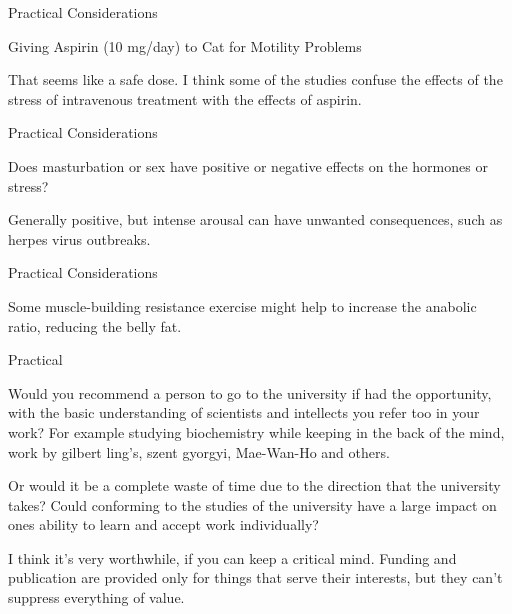 \documentclass[11pt,oneside,openany,extrafontsizes]{memoir}
\begin{document}
\begin{standalonequote}{Practical Considerations}
    \begin{note}
        Giving Aspirin (10 mg/day) to Cat for Motility Problems
    \end{note}

    \begin{answer}
        That seems like a safe dose. I think some of the studies confuse the effects of the stress of intravenous treatment with the effects of aspirin.
    \end{answer}
\end{standalonequote}

\begin{qaexchange}{Practical Considerations}

    \begin{question}
        Does masturbation or sex have positive or negative effects on the hormones or stress?
    \end{question}

    \begin{answer}
        Generally positive, but intense arousal can have unwanted consequences, such as herpes virus outbreaks.
    \end{answer}
\end{qaexchange}

\begin{standalonequote}{Practical Considerations}

    \begin{answer}
        Some muscle-building resistance exercise might help to increase the anabolic ratio, reducing the belly fat.
    \end{answer}
\end{standalonequote}

\begin{qaexchange}{Practical}

    \begin{question}
        Would you recommend a person to go to the university if had the opportunity, with the basic understanding of scientists and intellects you refer too in your work? For example studying biochemistry while keeping in the back of the mind, work by gilbert ling's, szent gyorgyi, Mae-Wan-Ho and others.

        Or would it be a complete waste of time due to the direction that the university takes? Could conforming to the studies of the university have a large impact on ones ability to learn and accept work individually?
    \end{question}

    \begin{answer}
        I think it's very worthwhile, if you can keep a critical mind. Funding and publication are provided only for things that serve their interests, but they can't suppress everything of value.
    \end{answer}
\end{qaexchange}
\end{document}
